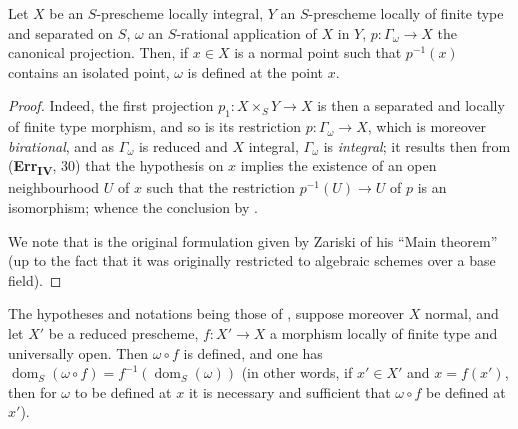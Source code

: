 \begin{proposition}[20.4.4]
\label{IV.20.4.4}
Let $X$ be an $S$-prescheme locally integral, $Y$ an $S$-prescheme locally of finite type and separated on $S$, $\omega$ an $S$-rational application of $X$ in $Y$, $p:\Gamma_\omega\to X$ the canonical projection.
Then, if $x\in X$ is a normal point such that $p^{-1}(x)$ contains an isolated point, $\omega$ is defined at the point $x$.
\end{proposition}

\begin{proof}
Indeed, the first projection $p_1:X\times_S Y\to X$ is then a separated and locally of finite type morphism, and so is its restriction $p:\Gamma_\omega\to X$, which is moreover \emph{birational}, and as $\Gamma_\omega$ is reduced and $X$ integral, $\Gamma_\omega$ is \emph{integral};
it results then from (\textbf{Err}\textsubscript{\textbf{IV}}, 30) that the hypothesis on $x$ implies the existence of an open neighbourhood $U$ of $x$ such that the restriction $p^{-1}(U)\to U$ of $p$ is an isomorphism; whence the conclusion by .

We note that  is the original formulation given by Zariski of his ``Main theorem'' (up to the fact that it was originally restricted to algebraic schemes over a base field).
\end{proof}

\begin{proposition}[20.4.5]
\label{IV.20.4.5}
The hypotheses and notations being those of , suppose moreover $X$ normal, and let $X'$ be a reduced prescheme, $f:X'\to X$ a morphism locally of finite type and universally open.
Then $\omega\circ f$ is defined, and one has $\operatorname{dom}_S(\omega\circ f)=f^{-1}(\operatorname{dom}_S(\omega))$ (in other words, if $x'\in X'$ and $x=f(x')$, then for $\omega$ to be defined at $x$ it is necessary and sufficient that $\omega\circ f$ be defined at $x'$).
\end{proposition}

